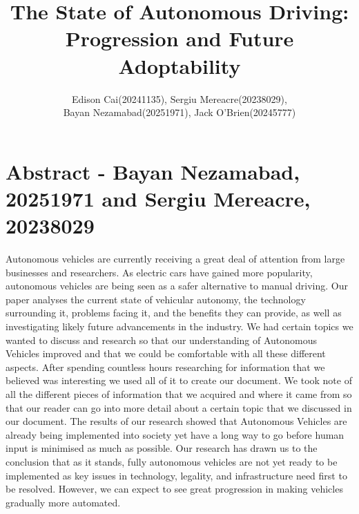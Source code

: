 \documentclass{article}
\date{}
\author{Edison Cai(20241135), Sergiu Mereacre(20238029),\\
Bayan Nezamabad(20251971), Jack O'Brien(20245777)}
\title{The State of Autonomous Driving: Progression and Future Adoptability}
\begin{document}
\maketitle

\section{Abstract - Bayan Nezamabad, 20251971 and Sergiu Mereacre, 20238029}
Autonomous vehicles are currently receiving a great deal of attention from large businesses and researchers. As electric cars have gained more popularity, autonomous vehicles are being seen as a safer alternative to manual driving. Our paper analyses the current state of vehicular autonomy, the technology surrounding it, problems facing it, and the benefits they can provide, as well as investigating likely future advancements in the industry.
\bigbreak
We had certain topics we wanted to discuss and research so that our understanding of Autonomous Vehicles improved and that we could be comfortable with all these different aspects. After spending countless hours researching for information that we believed was interesting we used all of it to create our document. We took note of all the different pieces of information that we acquired and where it came from so that our reader can go into more detail about a certain topic that we discussed in our document. 
\bigbreak
The results of our research showed that Autonomous Vehicles are already being implemented into society yet have a long way to go before human input is minimised as much as possible. Our research has drawn us to the conclusion that as it stands, fully autonomous vehicles are not yet ready to be implemented as key issues in technology, legality, and infrastructure need first to be resolved. However, we can expect to see great progression in making vehicles gradually more automated.
\end{document}
